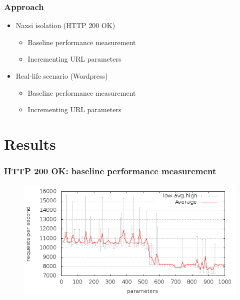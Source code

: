 \begin{frame}
  \frametitle{Approach}
  \begin{itemize}
   \item Naxsi isolation (HTTP 200 OK)
     \begin{itemize}
       \item Baseline performance measurement
       \item Incrementing URL parameters
     \end{itemize}
   \item Real-life scenario (Wordpress)
     \begin{itemize}
       \item Baseline performance measurement
       \item Incrementing URL parameters
     \end{itemize}
  \end{itemize}
\end{frame}

\section{Results}

\begin{frame}
  \frametitle{HTTP 200 OK: baseline performance measurement}
  \begin{figure}[H]
  \centering
  \includegraphics[scale=0.5] {../paper/images/results/baseline_200/output.png}
  \end{figure}
\end{frame}

